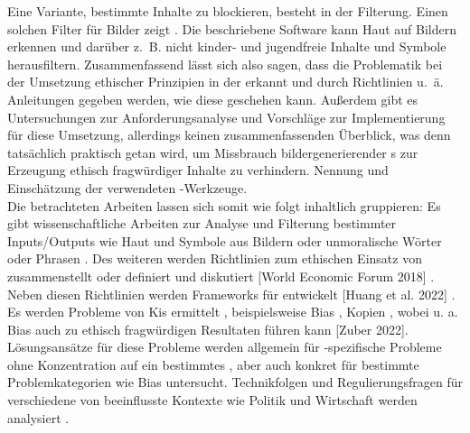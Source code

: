 Eine Variante, bestimmte Inhalte zu blockieren, besteht in der Filterung. Einen solchen Filter für Bilder zeigt \cite{Zheng}.
Die beschriebene Software kann Haut auf Bildern erkennen und darüber z. B. nicht kinder- und jugendfreie Inhalte und Symbole herausfiltern.
Zusammenfassend lässt sich also sagen, dass die Problematik bei der Umsetzung ethischer Prinzipien in der  erkannt und
durch Richtlinien u. ä. Anleitungen gegeben werden, wie diese geschehen kann. Außerdem gibt es Untersuchungen 
zur Anforderungsanalyse und Vorschläge zur Implementierung für diese Umsetzung, allerdings keinen zusammenfassenden 
Überblick, was denn tatsächlich praktisch getan wird, um Missbrauch bildergenerierender s zur Erzeugung ethisch 
fragwürdiger Inhalte zu verhindern.
Nennung und Einschätzung der verwendeten -Werkzeuge.\\

Die betrachteten Arbeiten lassen sich somit wie folgt inhaltlich gruppieren: Es gibt wissenschaftliche Arbeiten zur Analyse und Filterung
bestimmter Inputs/Outputs wie Haut und Symbole aus Bildern \cite{Zheng} oder unmoralische Wörter oder Phrasen \cite{Shah}. Des weiteren 
werden Richtlinien zum ethischen Einsatz von  zusammenstellt oder definiert und diskutiert \cite{Ayling} \cite{Srinivasan} 
\cite{Jameel} \cite{Hagendorff} \cite{Jobin} \cite{Unity} \cite{EUCommision}[World Economic Forum 2018] \cite{Mueller}.
Neben diesen Richtlinien werden Frameworks für  entwickelt [Huang et al. 2022] \cite{Mueller}. Es werden Probleme von Kis ermittelt \cite{Ayling}, 
beispielsweise Bias \cite{Salminen} \cite{Jameel}, Kopien \cite{Somepalli}, wobei u. a. Bias auch zu ethisch 
fragwürdigen Resultaten führen kann [Zuber 2022]. Lösungsansätze für diese Probleme werden allgemein für -spezifische Probleme ohne 
Konzentration auf ein bestimmtes \cite{Ayling} \cite{Avelar}, aber auch konkret für bestimmte Problemkategorien wie Bias \cite{Srinivasan}
\cite{Jameel}untersucht. Technikfolgen und Regulierungsfragen für verschiedene von  beeinflusste Kontexte wie Politik und Wirtschaft
werden analysiert \cite{Pawelec}.
